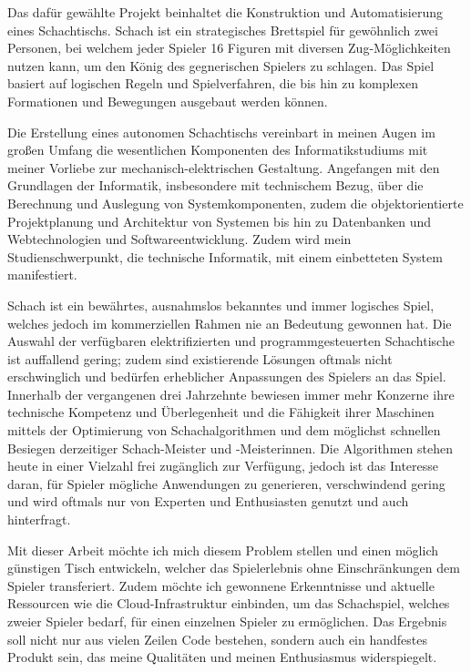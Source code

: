 Das dafür gewählte Projekt beinhaltet die Konstruktion und
Automatisierung eines Schachtischs. Schach ist ein strategisches
Brettspiel für gewöhnlich zwei Personen, bei welchem jeder Spieler 16
Figuren mit diversen Zug-Möglichkeiten nutzen kann, um den König des
gegnerischen Spielers zu schlagen. Das Spiel basiert auf logischen
Regeln und Spielverfahren, die bis hin zu komplexen Formationen und
Bewegungen ausgebaut werden können.

Die Erstellung eines autonomen Schachtischs vereinbart in meinen Augen
im großen Umfang die wesentlichen Komponenten des Informatikstudiums mit
meiner Vorliebe zur mechanisch-elektrischen Gestaltung. Angefangen mit
den Grundlagen der Informatik, insbesondere mit technischem Bezug, über
die Berechnung und Auslegung von Systemkomponenten, zudem die
objektorientierte Projektplanung und Architektur von Systemen bis hin zu
Datenbanken und Webtechnologien und Softwareentwicklung. Zudem wird mein
Studienschwerpunkt, die technische Informatik, mit einem einbetteten
System manifestiert.

Schach ist ein bewährtes, ausnahmslos bekanntes und immer logisches
Spiel, welches jedoch im kommerziellen Rahmen nie an Bedeutung gewonnen
hat. Die Auswahl der verfügbaren elektrifizierten und
programmgesteuerten Schachtische ist auffallend gering; zudem sind
existierende Lösungen oftmals nicht erschwinglich und bedürfen
erheblicher Anpassungen des Spielers an das Spiel. Innerhalb der
vergangenen drei Jahrzehnte bewiesen immer mehr Konzerne ihre technische
Kompetenz und Überlegenheit und die Fähigkeit ihrer Maschinen mittels
der Optimierung von Schachalgorithmen und dem möglichst schnellen
Besiegen derzeitiger Schach-Meister und -Meisterinnen. Die Algorithmen
stehen heute in einer Vielzahl frei zugänglich zur Verfügung, jedoch ist
das Interesse daran, für Spieler mögliche Anwendungen zu generieren,
verschwindend gering und wird oftmals nur von Experten und Enthusiasten
genutzt und auch hinterfragt.

Mit dieser Arbeit möchte ich mich diesem Problem stellen und einen
möglich günstigen Tisch entwickeln, welcher das Spielerlebnis ohne
Einschränkungen dem Spieler transferiert. Zudem möchte ich gewonnene
Erkenntnisse und aktuelle Ressourcen wie die Cloud-Infrastruktur
einbinden, um das Schachspiel, welches zweier Spieler bedarf, für einen
einzelnen Spieler zu ermöglichen. Das Ergebnis soll nicht nur aus vielen
Zeilen Code bestehen, sondern auch ein handfestes Produkt sein, das
meine Qualitäten und meinen Enthusiasmus widerspiegelt.

